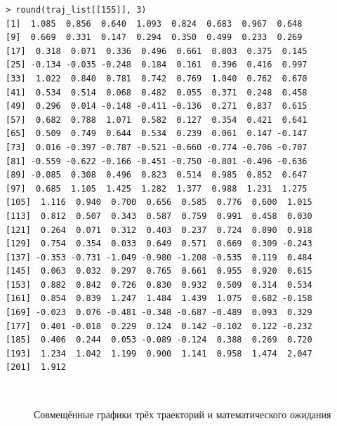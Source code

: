 \documentclass[14pt,a4paper]{scrartcl}
\begin{document}
	
\begin{verbatim}
> round(traj_list[[155]], 3)
[1]  1.085  0.856  0.640  1.093  0.824  0.683  0.967  0.648
[9]  0.669  0.331  0.147  0.294  0.350  0.499  0.233  0.269
[17]  0.318  0.071  0.336  0.496  0.661  0.803  0.375  0.145
[25] -0.134 -0.035 -0.248  0.184  0.161  0.396  0.416  0.997
[33]  1.022  0.840  0.781  0.742  0.769  1.040  0.762  0.670
[41]  0.534  0.514  0.068  0.482  0.055  0.371  0.248  0.458
[49]  0.296  0.014 -0.148 -0.411 -0.136  0.271  0.837  0.615
[57]  0.682  0.788  1.071  0.582  0.127  0.354  0.421  0.641
[65]  0.509  0.749  0.644  0.534  0.239  0.061  0.147 -0.147
[73]  0.016 -0.397 -0.787 -0.521 -0.660 -0.774 -0.706 -0.707
[81] -0.559 -0.622 -0.166 -0.451 -0.750 -0.801 -0.496 -0.636
[89] -0.085  0.308  0.496  0.823  0.514  0.985  0.852  0.647
[97]  0.685  1.105  1.425  1.282  1.377  0.988  1.231  1.275
[105]  1.116  0.940  0.700  0.656  0.585  0.776  0.600  1.015
[113]  0.812  0.507  0.343  0.587  0.759  0.991  0.458  0.030
[121]  0.264  0.071  0.312  0.403  0.237  0.724  0.890  0.918
[129]  0.754  0.354  0.033  0.649  0.571  0.669  0.309 -0.243
[137] -0.353 -0.731 -1.049 -0.980 -1.208 -0.535  0.119  0.484
[145]  0.063  0.032  0.297  0.765  0.661  0.955  0.920  0.615
[153]  0.882  0.842  0.726  0.830  0.932  0.509  0.314  0.534
[161]  0.854  0.839  1.247  1.484  1.439  1.075  0.682 -0.158
[169] -0.023  0.076 -0.481 -0.348 -0.687 -0.489  0.093  0.329
[177]  0.401 -0.018  0.229  0.124  0.142 -0.102  0.122 -0.232
[185]  0.406  0.244  0.053 -0.089 -0.124  0.388  0.269  0.720
[193]  1.234  1.042  1.199  0.900  1.141  0.958  1.474  2.047
[201]  1.912
\end{verbatim}

\begin{figure}[H]
	\begin{minipage}[h]{1\linewidth}
		  \\
		\caption*{Совмещённые графики трёх траекторий и математического ожидания}
	\end{minipage}
\end{figure}
\end{document}
